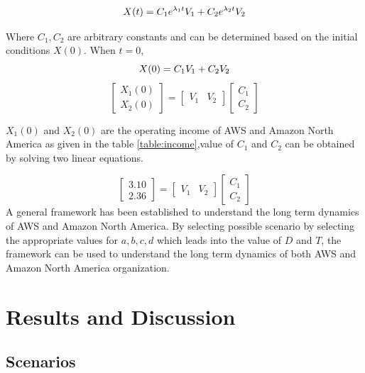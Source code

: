 \documentclass[fleqn,10pt]{SelfArx} %
\begin{document}
\begin{equation} \centering
X(t) = C_1 e^{\lambda_1 t}V_1 + C_2 e^{\lambda_2 t}V_2
\label{eq:ge2}
\end{equation}

Where $C_1,C_2$ are arbitrary constants and can be determined based on the initial conditions $X(0)$. When $t=0$,
\begin{equation} \centering
X(0) = C_1 V_1 + C_2 V_2  
\label{eq:ge3}
\end{equation}
\[
\begin{bmatrix}
X_1(0) \\ 
X_2(0) 
\end{bmatrix}
=
\begin{bmatrix}
V_1 & V_2
\end{bmatrix}
\begin{bmatrix}
C_1 \\
C_2
\end{bmatrix}
\]

$X_1(0)$ and $X_2(0)$ are the operating income of AWS and Amazon North America as given in the table \ref{table:income},value of $C_1$ and $C_2$ can be obtained by solving two linear equations.  

\[
\begin{bmatrix}
3.10 \\
2.36  
\end{bmatrix}
=
\begin{bmatrix}
V_1 & V_2
\end{bmatrix}
\begin{bmatrix}
C_1 \\
C_2
\end{bmatrix}
\]
A general framework has been established to understand the long term dynamics of AWS and Amazon North America. By selecting possible scenario by selecting the appropriate values for $a,b,c,d$ which leads into the value of $D$ and $T$, the framework can be used to understand the long term dynamics of both AWS and Amazon North America organization. 


\section{Results and Discussion}

\subsection{Scenarios}
\end{document}
